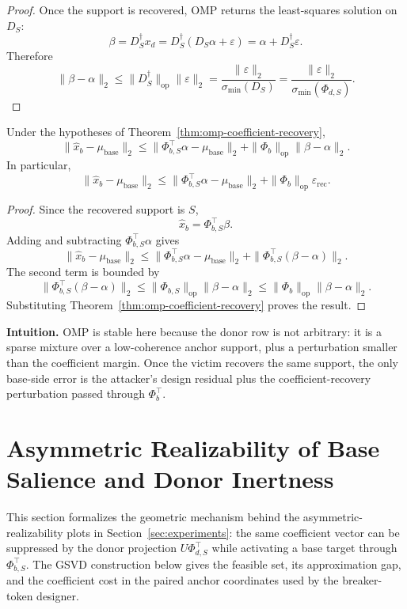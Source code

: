 \begin{proof}
Once the support is recovered, OMP returns the least-squares solution on $D_S$:
\[
\beta=D_S^\dagger x_d=D_S^\dagger(D_S\alpha+\varepsilon)=\alpha+D_S^\dagger\varepsilon.
\]
Therefore
\[
\|\beta-\alpha\|_2
\le
\|D_S^\dagger\|_{\mathrm{op}}\|\varepsilon\|_2
=
\frac{\|\varepsilon\|_2}{\sigma_{\min}(D_S)}
=
\frac{\|\varepsilon\|_2}{\sigma_{\min}(\Phi_{d,S})}.
\]
\end{proof}

\begin{corollary}
\label{cor:omp-base-reconstruction-error}
Under the hypotheses of Theorem~\ref{thm:omp-coefficient-recovery},
\[
\|\widehat{x}_b-\mu_{\text{base}}\|_2
\le
\|\Phi_{b,S}^\top\alpha-\mu_{\text{base}}\|_2
+
\|\Phi_b\|_{\mathrm{op}}\|\beta-\alpha\|_2.
\]
In particular,
\[
\|\widehat{x}_b-\mu_{\text{base}}\|_2
\le
\|\Phi_{b,S}^\top\alpha-\mu_{\text{base}}\|_2
+
\|\Phi_b\|_{\mathrm{op}}\varepsilon_{\mathrm{rec}}.
\]
\end{corollary}

\begin{proof}
Since the recovered support is $S$,
\[
\widehat{x}_b=\Phi_{b,S}^\top\beta.
\]
Adding and subtracting $\Phi_{b,S}^\top\alpha$ gives
\[
\|\widehat{x}_b-\mu_{\text{base}}\|_2
\le
\|\Phi_{b,S}^\top\alpha-\mu_{\text{base}}\|_2
+
\|\Phi_{b,S}^\top(\beta-\alpha)\|_2.
\]
The second term is bounded by
\[
\|\Phi_{b,S}^\top(\beta-\alpha)\|_2
\le
\|\Phi_{b,S}\|_{\mathrm{op}}\|\beta-\alpha\|_2
\le
\|\Phi_b\|_{\mathrm{op}}\|\beta-\alpha\|_2.
\]
Substituting Theorem~\ref{thm:omp-coefficient-recovery} proves the result.
\end{proof}

\noindent\textbf{Intuition.}
OMP is stable here because the donor row is not arbitrary: it is a sparse mixture over a low-coherence anchor support, plus a perturbation smaller than the coefficient margin. Once the victim recovers the same support, the only base-side error is the attacker's design residual plus the coefficient-recovery perturbation passed through $\Phi_b^\top$.

\section{Asymmetric Realizability of Base Salience and Donor Inertness}
\label{app:asymmetric-realizability}

This section formalizes the geometric mechanism behind the asymmetric-realizability plots in Section~\ref{sec:experiments}: the same coefficient vector can be suppressed by the donor projection $U\Phi_{d,S}^\top$ while activating a base target through $\Phi_{b,S}^\top$. The GSVD construction below gives the feasible set, its approximation gap, and the coefficient cost in the paired anchor coordinates used by the breaker-token designer.

